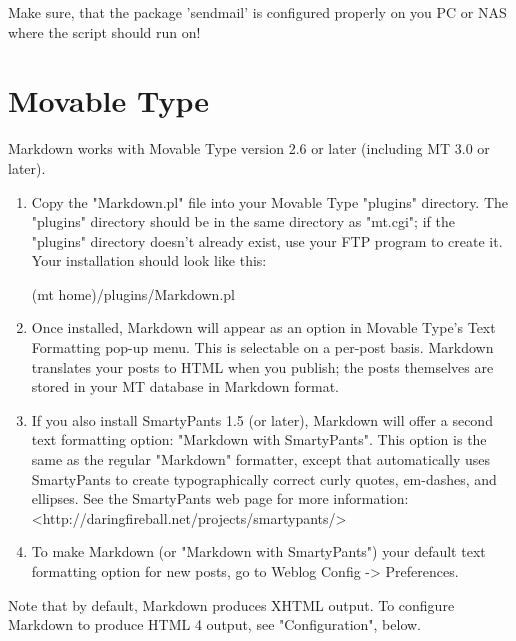       Make sure, that the package 'sendmail' is configured properly on you PC or NAS
      where the script should run on!


\section{Movable Type}

Markdown works with Movable Type version 2.6 or later (including 
MT 3.0 or later).

\begin{enumerate}
\item  Copy the "Markdown.pl" file into your Movable Type "plugins"
    directory. The "plugins" directory should be in the same directory
    as "mt.cgi"; if the "plugins" directory doesn't already exist, use
    your FTP program to create it. Your installation should look like
    this:

        (mt home)/plugins/Markdown.pl

\item Once installed, Markdown will appear as an option in Movable Type's
    Text Formatting pop-up menu. This is selectable on a per-post basis.
    Markdown translates your posts to HTML when you publish; the posts
    themselves are stored in your MT database in Markdown format.

\item If you also install SmartyPants 1.5 (or later), Markdown will offer
    a second text formatting option: "Markdown with SmartyPants". This
    option is the same as the regular "Markdown" formatter, except that
    automatically uses SmartyPants to create typographically correct
    curly quotes, em-dashes, and ellipses. See the SmartyPants web page
    for more information: <http://daringfireball.net/projects/smartypants/>

\item To make Markdown (or "Markdown with SmartyPants") your default
    text formatting option for new posts, go to Weblog Config ->
    Preferences.
\end{enumerate}

Note that by default, Markdown produces XHTML output. To configure
Markdown to produce HTML 4 output, see "Configuration", below.


